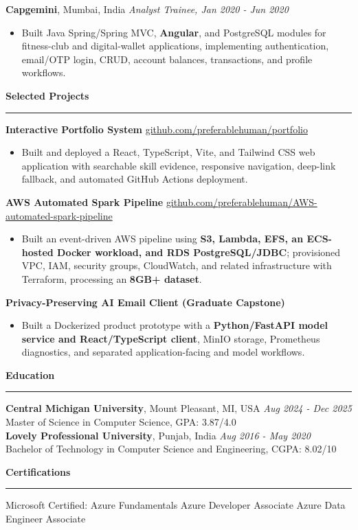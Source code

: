 \documentclass[11pt,letterpaper]{article}
\newcommand{\ressection}[1]{\Needspace{6\baselineskip}\vspace{8pt}\par\textbf{#1}\par\vspace{2pt}\hrule\vspace{5pt}}
\begin{document}
\textbf{Capgemini}, Mumbai, India \hfill \textit{Analyst Trainee, Jan 2020 - Jun 2020}
\begin{itemize}
  \item Built Java Spring/Spring MVC, \textbf{Angular}, and PostgreSQL modules for fitness-club and digital-wallet applications, implementing authentication, email/OTP login, CRUD, account balances, transactions, and profile workflows.
\end{itemize}

\ressection{Selected Projects}
\textbf{Interactive Portfolio System} \hfill \href{https://github.com/preferablehuman/portfolio}{github.com/preferablehuman/portfolio}
\begin{itemize}
  \item Built and deployed a React, TypeScript, Vite, and Tailwind CSS web application with searchable skill evidence, responsive navigation, deep-link fallback, and automated GitHub Actions deployment.
\end{itemize}
\vspace{2pt}
\textbf{AWS Automated Spark Pipeline} \hfill \href{https://github.com/preferablehuman/AWS-automated-spark-pipeline}{github.com/preferablehuman/AWS-automated-spark-pipeline}
\begin{itemize}
  \item Built an event-driven AWS pipeline using \textbf{S3, Lambda, EFS, an ECS-hosted Docker workload, and RDS PostgreSQL/JDBC}; provisioned VPC, IAM, security groups, CloudWatch, and related infrastructure with Terraform, processing an \textbf{8GB+ dataset}.
\end{itemize}
\vspace{2pt}
\textbf{Privacy-Preserving AI Email Client (Graduate Capstone)}
\begin{itemize}
  \item Built a Dockerized product prototype with a \textbf{Python/FastAPI model service and React/TypeScript client}, MinIO storage, Prometheus diagnostics, and separated application-facing and model workflows.
\end{itemize}

\ressection{Education}
\textbf{Central Michigan University}, Mount Pleasant, MI, USA \hfill \textit{Aug 2024 - Dec 2025}\\
Master of Science in Computer Science, GPA: 3.87/4.0\\[2pt]
\textbf{Lovely Professional University}, Punjab, India \hfill \textit{Aug 2016 - May 2020}\\
Bachelor of Technology in Computer Science and Engineering, CGPA: 8.02/10

\ressection{Certifications}
Microsoft Certified: Azure Fundamentals \textbar{} Azure Developer Associate \textbar{} Azure Data Engineer Associate
\end{document}
